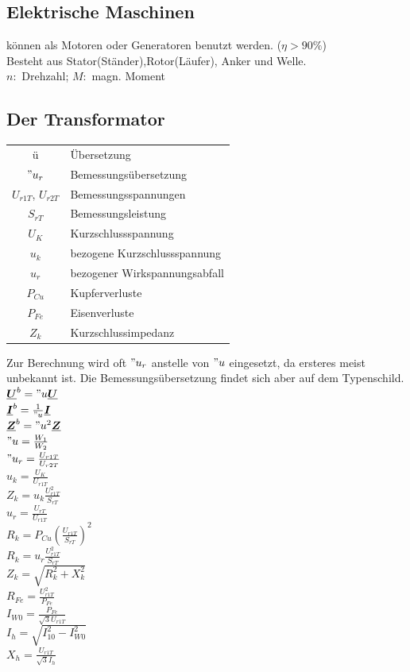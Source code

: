 \documentclass[6pt,a4paper]{scrartcl}
\renewcommand{\vec}[1]{\ensuremath{\underline{\boldsymbol {#1}}}}
\begin{document}
\begin{multicols}{4}
	\section{Elektrische Maschinen}
	können als Motoren oder Generatoren benutzt werden. ($\eta > 90\%$)\\
	Besteht aus Stator(Ständer),Rotor(Läufer), Anker und Welle.\\
	$n:$ Drehzahl; $M:$ magn. Moment\\


		\subsection{Der Transformator}
		\begin{tabular}{cl}
		ü & Übersetzung \\
		$"u_r$ & Bemessungsübersetzung \\
		$U_{r1T}$, $U_{r2T}$ & Bemessungsspannungen \\
		$S_{rT}$ & Bemessungsleistung \\
		$U_{K}$ & Kurzschlussspannung \\
		$u_k$ & bezogene Kurzschlussspannung \\
		$u_r$ & bezogener Wirkspannungsabfall \\
		$P_{Cu}$ & Kupferverluste \\
		$P_{Fe}$ & Eisenverluste \\
		$Z_k$ & Kurzschlussimpedanz
		\end{tabular}
		

		Zur Berechnung wird oft $"u_r$ anstelle von $"u$ eingesetzt, da ersteres meist unbekannt ist. Die Bemessungsübersetzung findet sich aber auf dem Typenschild. \\
		$\vec U^b = "u \vec U$ \\
		$\vec I^b = \frac{1}{"u} \vec I$ \\
		$\vec Z^b = "u^2 \vec Z$ \\
		$"u = \frac{W_1}{W_2}$ \\
		$"u_r = \frac{U_{r1T}}{U_{r2T}}$ \\
		$u_k = \frac{U_{K}}{U_{r1T}}$ \\
		$Z_k = u_k \frac{U_{r1T}^2}{S_{rT}}$ \\
		$u_r = \frac{U_{rT}}{U_{r1T}}$ \\
		$R_k = P_{Cu} \left( \frac{U_{r1T}}{S_{rT}} \right)^2$ \\
		$R_k = u_r \frac{U_{r1T}^2}{S_{rT}}$ \\
		$Z_k = \sqrt{R_k^2 + X_k^2}$ \\
		$R_{Fe} = \frac{U_{r1T}^2}{P_{Fe}}$ \\
		$I_{W0} = \frac{P_{Fe}}{\sqrt{3} U_{r1T}}$ \\
		$I_h = \sqrt{I_{10}^2 - I_{W0}^2}$ \\
		$X_h = \frac{U_{r1T}}{\sqrt{3} I_h}$
	

\end{multicols}
\end{document}
